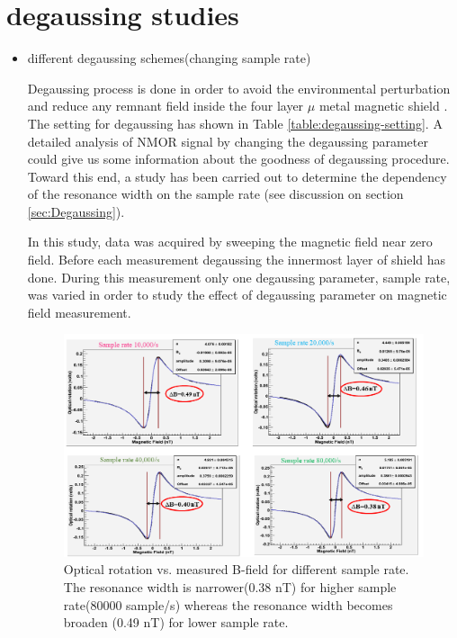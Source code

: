    
   \section{degaussing studies\label{sec:degaussing}}  
   \begin{itemize}
   \item different degaussing schemes(changing sample rate)
   
  
Degaussing process is done in order to avoid the environmental perturbation and reduce any remnant field inside the four layer $\mu$ metal magnetic shield \cite{doi:10.1063/1.2713433}. The setting for degaussing has shown in Table \ref{table:degaussing-setting}.  A detailed analysis of NMOR signal by changing the degaussing parameter could give us some information about the goodness of degaussing procedure. Toward this end, a study has been carried out to determine  the dependency of the resonance width on the sample rate (see discussion on section \ref{sec:Degaussing}). 

In this study, data was acquired by sweeping the magnetic field near zero field. Before each measurement degaussing the innermost layer of shield has done. During this measurement only one degaussing parameter, sample rate, was varied in order to study the effect of degaussing parameter on magnetic field measurement.  

   \begin{figure}[h]
\centering\includegraphics[width=0.7\linewidth]{figures/sample_rate}
\caption{ Optical rotation vs. measured B-field   for different sample rate. The resonance width is narrower(0.38 nT) for higher sample rate(80000 sample/s) whereas the resonance width becomes broaden (0.49 nT) for lower sample rate.\label{fig:different sample rate} }
\end{figure}


\end{itemize}
